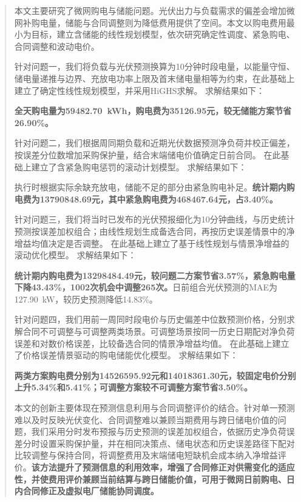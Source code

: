 \begin{abstract}

本文主要研究了微网购电与储能问题。光伏出力与负载需求的偏差会增加微网补购电量，储能与合同调整则为降低费用提供了空间。本文以购电费用最小为目标，建立含储能的线性规划模型，依次研究确定性调度、紧急购电、合同调整和波动电价。\par\medskip

针对问题一，我们将负载与光伏预测换算为10分钟时段电量，以能量守恒、储电量递推与边界、充放电功率上限及首末储电量相等为约束，在此基础上建立了确定性线性规划模型，并采用HiGHS求解。
求解结果如下：

\textbf{全天购电量为59482.70~kWh，购电费为35126.95元，较无储能方案节省26.90\%。}\par\medskip

针对问题二，我们根据周同期负载和近期光伏数据预测净负荷并校正偏差，按误差分位数增加采购保护量，结合末端储电价值确定日前合同。
在此基础上建立了含紧急购电惩罚的滚动计划模型。
求解结果如下：

执行时根据实际余缺充放电，储能不足的部分由紧急购电补足。\textbf{统计期内购电费为13790848.69元，其中紧急购电费为468467.64元，占3.40\%。}\par\medskip

针对问题三，我们将当时已发布的光伏预报细化为10分钟曲线，与历史统计预测按误差加权组合；由线性规划生成备选合同，再按历史误差情景中的净增益均值决定是否调整。
在此基础上建立了基于线性规划与情景净增益的滚动优化模型。
求解结果如下：

\textbf{统计期内购电费为13298484.49元，较问题二方案节省3.57\%，紧急购电量下降43.43\%，1002次机会中调整265次。}日前组合光伏预测的MAE为127.90~kW，较历史预测降低14.83\%。\par\medskip

针对问题四，我们用前一周同时段电价与历史偏差中位数预测价格，分别求解合同不可调整与可调整两类场景。可调整场景按同一历史日期配对净负荷误差和对数价格误差，比较备选合同的情景净增益均值。
在此基础上建立了价格误差情景驱动的购电储能优化模型。
求解结果如下：

\textbf{两类方案购电费分别为14526595.92元和14018361.30元，较固定电价分别上升5.34\%和5.41\%；可调整方案较不可调整方案节省3.50\%。}\par\medskip

本文的创新主要体现在预测信息利用与合同调整评价的结合。针对单一预测难以及时反映光伏变化、合同调整难以兼顾当期费用与跨日储电价值的问题，我们采用分时发布预报与历史预测的误差加权组合，依据历史净负荷误差分时设置采购保护量，并在相同决策点、储电状态和历史误差路径下配对比较调整与保持合同，将调整费用及末端储电短缺机会成本纳入净增益评价。\textbf{该方法提升了预测信息的利用效率，增强了合同修正对供需变化的适应性，并使费用评价兼顾当前结算与跨日储能价值，可用于微网日前购电、日内合同修正及虚拟电厂储能协同调度。}


\end{abstract}
